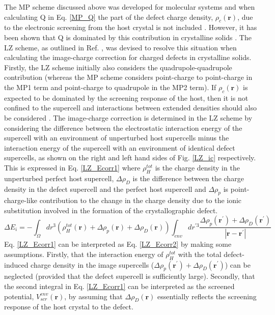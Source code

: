 \documentclass[11pt, twoside]{report}
\begin{document}
The MP scheme \cite{MP} discussed above was developed for molecular systems and when calculating Q in Eq. \ref{MP_Q} the part of the defect charge density, $\rho_c(\mathbf{r})$, due to the electronic screening from the host crystal is not included \cite{Lany_defects_2008, Lany_defects}. However, it has been shown that Q is dominated by this contribution in crystalline solids \cite{Lany_defects_2008}. The LZ scheme, as outlined in Ref. , was devised to resolve this situation when calculating the image-charge correction for charged defects in crystalline solids. Firstly, the LZ scheme initially also considers the quadrupole-quadrupole contribution (whereas the MP scheme considers point-charge to point-charge in the MP1 term and point-charge to quadrupole in the MP2 term). If $\rho_c(\mathbf{r})$ is expected to be dominated by the screening response of the host, then it is not confined to the supercell and interactions between extended densities should also be considered \cite{Lany_defects}.
The image-charge correction is determined in the LZ scheme by considering the difference between the electrostatic interaction energy of the supercell with an environment of
unperturbed host supercells minus the interaction energy of the supercell with an environment of identical defect supercells, as shown on the right and left hand sides of Fig. \ref{LZ_ic} respectively. This is expressed in Eq. \ref{LZ_Ecorr1} where $\rho_H^{tot}$ is the charge density in the unperturbed perfect host supercell, $\Delta \rho_D$ is the difference between the charge density in the defect supercell and the perfect host supercell and $\Delta \rho_p$ is point-charge-like contribution to the change in the charge density due to the ionic substitution involved in the formation of the crystallographic defect.
\begin{equation}\label{LZ_Ecorr1}
\Delta E_i = - \int_{\Omega} dr^3 ( \rho_H^{tot}(\mathbf{r}) + \Delta \rho_p(\mathbf{r}) + \Delta \rho_D(\mathbf{r}) ) \int_{env} dr^{\prime 3} \frac{\Delta \rho_p(\mathbf{r^{\prime}}) + \Delta \rho_D(\mathbf{r^{\prime}})}{ | \mathbf{r} - \mathbf{r^{\prime}} | }
\end{equation}
Eq. \ref{LZ_Ecorr1} can be interpreted as Eq. \ref{LZ_Ecorr2} by making some assumptions. Firstly, that the interaction energy of $\rho_H^{tot}$ with the total defect-induced charge density in the image supercells ($\Delta \rho_p(\mathbf{r^{\prime}}) + \Delta \rho_D(\mathbf{r^{\prime}})$) can be neglected (provided that the defect supercell is sufficiently large). Secondly, that the second integral in Eq. \ref{LZ_Ecorr1} can be interpreted as the screened potential, $V_{scr}^{env}(\mathbf{r})$, by assuming that $\Delta \rho_D(\mathbf{r})$ essentially reflects the screening response of the host crystal to the defect.
\end{document}
